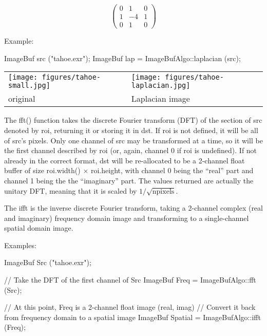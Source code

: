 \[ \left( \begin{array}{ccc}
0 &  1 & 0 \\
1 & -4 & 1 \\
0 &  1 & 0 \end{array} \right)\]

\smallskip
\noindent Example:
\begin{code}
    ImageBuf src ("tahoe.exr");
    ImageBuf lap = ImageBufAlgo::laplacian (src);
\end{code}

\spc \begin{tabular}{ll}
\texttt{[image: figures/tahoe-small.jpg]} &
\texttt{[image: figures/tahoe-laplacian.jpg]} \\
original & Laplacian image \\
\end{tabular}
\apiend


 
 

The {\cf fft()} function takes the discrete Fourier transform (DFT) of
the section of {\cf src} denoted by {\cf roi}, returning it or storing it in {\cf dst}.
If {\cf roi} is not defined, it will be all of {\cf src}'s pixels.  Only
one channel of {\cf src} may be transformed at a time, so it will be the
first channel described by {\cf roi} (or, again, channel 0 if {\cf roi}
is undefined).  If not already in the correct format, {\cf dst} will be
re-allocated to be a 2-channel {\cf float} buffer of size
{\cf roi.width()} $\times$ {\cf roi.height}, with channel 0 being the
``real'' part and channel 1 being the the ``imaginary'' part.  The
values returned are actually the unitary DFT, meaning that it is scaled
by $1/\sqrt{\mathrm{npixels}}$.

The {\cf ifft} is the inverse discrete Fourier transform, taking a 2-channel
complex (real and imaginary) frequency domain image and transforming to a
single-channel spatial domain image.

\smallskip
\noindent Examples:
\begin{code}
    ImageBuf Src ("tahoe.exr");

    // Take the DFT of the first channel of Src
    ImageBuf Freq = ImageBufAlgo::fft (Src);

    // At this point, Freq is a 2-channel float image (real, imag)
    // Convert it back from frequency domain to a spatial image
    ImageBuf Spatial = ImageBufAlgo::ifft (Freq);
\end{code}
\apiend

